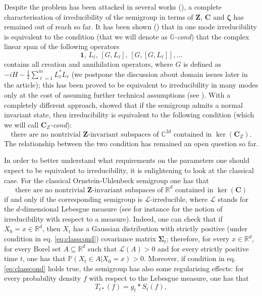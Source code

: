 \documentclass[preprint]{elsarticle}
\theoremstyle{definition}
\def\CC{\mathbb{C}}
\def\RR{\mathbb{R}}
\begin{document}
Despite the problem has been attacked in several works (\cite{AFP22b,FP22,GP26}), a complete characterisation of irreducibility of the semigroup in terms of $\mathbf{Z}$, $\mathbf{C}$ and $\boldsymbol{\zeta}$ has remained out of reach so far. It has been shown (\cite{AFP21}) that in one mode irreducibility is equivalent to the condition (that we will denote as \textit{$\mathbb{G}$-cond}) that the complex linear span of the following operators
$$\mathbf{1}, \,L_\ell, \, [G,L_\ell], \, [G, [G,L_\ell]], \dots
$$
contains all creation and annihilation operators, where $G$ is defined as $-iH-\frac{1}{2}\sum_{\ell=1}^{m}L^*_\ell L_\ell$ (we postpone the discussion about domain issues later in the article); this has been proved to be equivalent to irreducibility in many modes only at the cost of assuming further technical assumptions (see \cite{FP22}). With a completely different approach, \cite{GP26} showed that if the semigroup admits a normal invariant state, then irreducibility is equivalent to the following condition (which we will call \textit{$\mathbf{C}_{Z}$-cond}):
$$\text{there are no nontrivial $\mathbf{Z}$-invariant subspaces of } \CC^{2d} \text{ contained in } \ker(\mathbf{C}_{Z}).$$
The relationship between the two condition has remained an open question so far.

\bigskip In order to better understand what requirements on the parameters one should expect to be equivalent to irreducibility, it is enlightening to look at the classical case. For the classical Ornstein-Uhlenbeck semigroup one has that
\begin{equation} \label{eq:classcond}
\text{there are no nontrivial $\mathbf{Z}$-invariant subspaces of $\RR^d$ contained in $\ker(\mathbf{C})$}
\end{equation}
if and only if the corresponding semigroup is $\mathscr{L}$-irreducible, where $\mathscr{L}$ stands for the $d$-dimensional Lebesgue measure (see for instance \cite{MTG09} for the notion of irreducibility with respect to a measure). Indeed, one can check that if $X_0=x \in \RR^d$, then $X_t$ has a Gaussian distribution with strictly positive (under condition in eq. \eqref{eq:classcond}) covariance matrix $\boldsymbol{\Sigma}_t$; therefore, for every $x \in \RR^d$, for every Borel set $A \subseteq \RR^{d}$ such that $\mathscr{L}(A)>0$ and for every strictly positive time $t$, one has that
$\mathbb{P}(X_t \in A|X_0=x)>0.$
Moreover, if condition in eq. \eqref{eq:classcond} holds true, the semigroup has also some regularising effects: for every probability density $f$ with respect to the Lebesgue measure, one has that
\begin{equation}\label{eq:clrepresentation}T_{t*}(f)=g_t *S_t(f),\end{equation}
\end{document}
